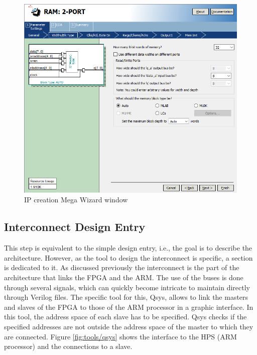 \begin{figure}[H]
    \centering
    \includegraphics[scale=0.6]{Chapter2-FPGA_Flow/res/megawizard.PNG}
    \caption{IP creation Mega Wizard window}
    \label{fig:tools/megawizard}
\end{figure}

\subsection{Interconnect Design Entry}

This step is equivalent to the simple design entry, i.e., the goal is to describe the architecture. 
However, as the tool to design the interconnect is specific, a section is dedicated to it. As discussed previously the interconnect is the part of the architecture that links the FPGA and the ARM. The 
use of the buses is done through several signals, which can quickly become intricate to 
maintain directly through Verilog files. The specific tool for this, Qsys, allows to link 
the masters and slaves of the FPGA to those of the ARM processor in a graphic interface. In this 
tool, the address space of each slave has to be specified. Qsys checks if the specified 
addresses are not outside the address space of the master to which they are connected. Figure \ref{fig:tools/qsys} 
shows the interface to the HPS (ARM processor) and the connections to a slave.

